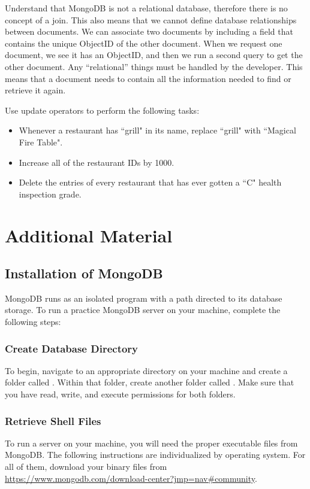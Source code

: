 Understand that MongoDB is not a relational database, therefore there is no concept of a join.  This also means that we cannot define database relationships between documents.  We can associate two documents by including a field that contains the unique ObjectID of the other document.  When we request one document, we see it has an ObjectID, and then we run a second query to get the other document.  Any ``relational'' things must be handled by the developer.  This means that a document needs to contain all the information needed to find or retrieve it again.

\begin{problem}
Use update operators to perform the following tasks:
\begin{itemize}
\item Whenever a restaurant has ``grill" in its name, replace ``grill" with ``Magical Fire Table".
\item Increase all of the restaurant IDs by 1000.
\item Delete the entries of every restaurant that has ever gotten a ``C" health inspection grade.
\end{itemize}
\end{problem}

\section*{Additional Material} %

\subsection*{Installation of MongoDB}

MongoDB runs as an isolated program with a path directed to its database storage.
To run a practice MongoDB server on your machine, complete the following steps:

\subsubsection*{Create Database Directory}
To begin, navigate to an appropriate directory on your machine and create a folder called .
Within that folder, create another folder called .
Make sure that you have read, write, and execute permissions for both folders.

\subsubsection*{Retrieve Shell Files}
To run a server on your machine, you will need the proper executable files from MongoDB.
The following instructions are individualized by operating system.
For all of them, download your binary files from \url{https://www.mongodb.com/download-center?jmp=nav#community}.

